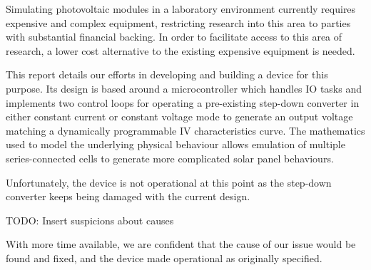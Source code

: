 

Simulating  photovoltaic modules in a laboratory environment currently  requires
expensive and complex equipment,  restricting research into this area to parties
with substantial financial backing.
In order to facilitate access to this area of research, a lower cost alternative
to the existing expensive equipment is needed.

This  report details our efforts in developing and building a  device  for  this
purpose. Its design is based around a microcontroller which handles IO tasks and
implements two control loops for operating a pre-existing step-down converter in
either constant  current  or constant voltage mode to generate an output voltage
matching  a  dynamically programmable IV characteristics curve. The  mathematics
used to  model  the  underlying  physical behaviour allows emulation of multiple
series-connected  cells to generate more  complicated  solar  panel  behaviours.

Unfortunately, the  device is not operational  at this point as  the step-down
converter keeps being damaged with the current design.

TODO: Insert suspicions about causes

With more time available,  we are confident that the cause  of our issue would
be found and fixed, and the device made operational as originally specified.

